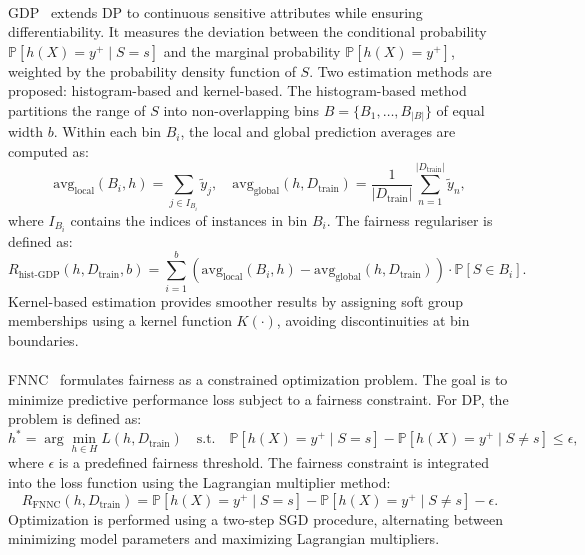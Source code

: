 \paragraph{}
\label{par:gdp-fairness}
%
\Gls{GDP}~\cite{DBLP:conf/iclr/JiangHFYMH22} extends \gls{DP} to continuous sensitive attributes while ensuring differentiability.
%
It measures the deviation between the conditional probability \( \mathbb{P}[h(X) = y^+ \mid S = s] \) and the marginal probability \( \mathbb{P}[h(X) = y^+] \), weighted by the probability density function of \( S \).
%
Two estimation methods are proposed: histogram-based and kernel-based.
%
The histogram-based method partitions the range of \( S \) into non-overlapping bins \( B = \{B_1, \ldots, B_{|B|}\} \) of equal width \( b \).
%
Within each bin \( B_i \), the local and global prediction averages are computed as:
%
\begin{equation}
    \label{eq:gdp-averages}
    \text{avg}_{\text{local}}(B_i, h) = \sum_{j \in I_{B_i}} \tilde{y}_j, \quad \text{avg}_{\text{global}}(h, D_{\text{train}}) = \frac{1}{|D_{\text{train}}|} \sum_{n=1}^{|D_{\text{train}}|} \tilde{y}_n,
\end{equation}
%
where \( I_{B_i} \) contains the indices of instances in bin \( B_i \).
%
The fairness regulariser is defined as:
%
\begin{equation}
    \label{eq:gdp-regulariser}
    R_{\text{hist-GDP}}(h, D_{\text{train}}, b) = \sum_{i=1}^{b} \left(\text{avg}_{\text{local}}(B_i, h) - \text{avg}_{\text{global}}(h, D_{\text{train}})\right) \cdot \mathbb{P}[S \in B_i].
\end{equation}
%
Kernel-based estimation provides smoother results by assigning soft group memberships using a kernel function \( K(\cdot) \), avoiding discontinuities at bin boundaries.
%

\paragraph{}
\label{par:fnnc-fairness}
%
\Gls{FNNC}~\cite{DBLP:conf/ijcai/ManishaG20} formulates fairness as a constrained optimization problem.
%
The goal is to minimize predictive performance loss subject to a fairness constraint.
%
For \gls{DP}, the problem is defined as:
%
\begin{equation}
    \label{eq:fnnc-fairness}
    h^\ast = \arg\min_{h \in H} L(h, D_{\text{train}}) \quad \text{s.t.} \quad \mathbb{P}[h(X) = y^+ \mid S = s] - \mathbb{P}[h(X) = y^+ \mid S \neq s] \leq \epsilon,
\end{equation}
%
where \( \epsilon \) is a predefined fairness threshold.
%
The fairness constraint is integrated into the loss function using the Lagrangian multiplier method:
%
\begin{equation}
    \label{eq:fnnc-fairness-regularizer}
    R_{\text{FNNC}}(h, D_{\text{train}}) = \mathbb{P}[h(X) = y^+ \mid S = s] - \mathbb{P}[h(X) = y^+ \mid S \neq s] - \epsilon.
\end{equation}
%
Optimization is performed using a two-step \gls{SGD} procedure, alternating between minimizing model parameters and maximizing Lagrangian multipliers.
%

